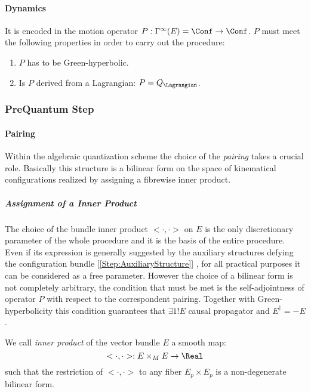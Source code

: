 \documentclass[Main]{subfiles}
\begin{document}
   		\paragraph{Dynamics}
		It is encoded in the motion operator $P: \Gamma^\infty (E)= \Conf \rightarrow \Conf$.
   		$P$ must meet the following properties in order to carry out the procedure:
   				   	\begin{enumerate}
   						\item $P$ has to be Green-hyperbolic.%
   						\item Is $P$ derived from a Lagrangian: $P=Q_\Lagrangian$.%
   					\end{enumerate}
   					
	\subsubsection{PreQuantum Step}%
		\paragraph{Pairing}\label{Paragraph:Pairing Construction}
				Within the algebraic quantization scheme the choice of the \emph{pairing} takes a crucial role.
				Basically this structure is a bilinear form on the space of kinematical configurations realized by assigning a fibrewise inner product.

			\subparagraph{Assignment of a Inner Product}
				The choice of the bundle inner product  $<\cdot,\cdot>$ on $E$ is the only discretionary parameter of the whole procedure and it is the basis of the entire procedure.\\
				Even if its expression is generally suggested by the auxiliary structures defying the configuration bundle [\ref{Step:AuxiliaryStructure}] , for all practical purposes it can be considered as a free parameter.
				However the choice of a bilinear form is not completely arbitrary, the condition that must be met is the self-adjointness of operator $P$ with respect to the correspondent pairing.
				Together with Green-hyperbolicity this condition guarantees that $\exists 1! E$ causal propagator and $E^\dagger =  -E$.
			\begin{definition}%
				We call \emph{inner product} of the vector bundle $E$ a smooth map:
				\begin{displaymath}
					<\cdot,\cdot> : E \times_M E \rightarrow \Real
				\end{displaymath}
				such that the restriction of $<\cdot,\cdot>$ to any fiber $E_p\times E_p$ is a non-degenerate bilinear form.
			\end{definition}
\end{document}
